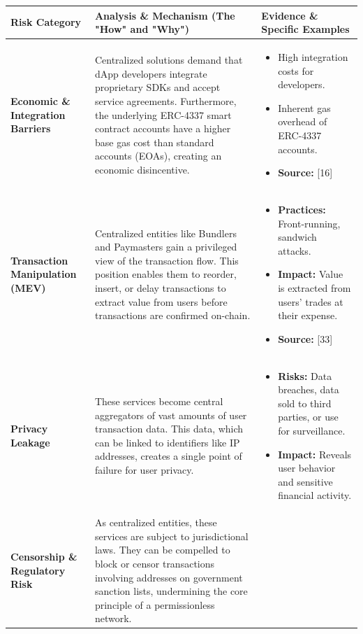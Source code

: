 \documentclass[preprint,12pt]{elsarticle}
\begin{document}
\begin{table}[htbp]
\centering
\footnotesize
\renewcommand{\arraystretch}{0.9}
\begin{tabularx}{\textwidth}{|p{3cm}|X|X|}
\hline
\textbf{Risk Category} & \textbf{Analysis \& Mechanism (The "How" and "Why")} & \textbf{Evidence \& Specific Examples} \\
\hline
\textbf{Economic \& Integration Barriers} & Centralized solutions demand that dApp developers integrate proprietary SDKs and accept service agreements. Furthermore, the underlying ERC-4337 smart contract accounts have a higher base gas cost than standard accounts (EOAs), creating an economic disincentive. & \begin{itemize}[noitemsep,topsep=0pt]
\item High integration costs for developers.
\item Inherent gas overhead of ERC-4337 accounts.
\item \textbf{Source:} [16]
\end{itemize} \\
\hline
\textbf{Transaction Manipulation (MEV)} & Centralized entities like Bundlers and Paymasters gain a privileged view of the transaction flow. This position enables them to reorder, insert, or delay transactions to extract value from users before transactions are confirmed on-chain. & \begin{itemize}[noitemsep,topsep=0pt]
\item \textbf{Practices:} Front-running, sandwich attacks.
\item \textbf{Impact:} Value is extracted from users' trades at their expense.
\item \textbf{Source:} [33]
\end{itemize} \\
\hline
\textbf{Privacy Leakage} & These services become central aggregators of vast amounts of user transaction data. This data, which can be linked to identifiers like IP addresses, creates a single point of failure for user privacy. & \begin{itemize}[noitemsep,topsep=0pt]
\item \textbf{Risks:} Data breaches, data sold to third parties, or use for surveillance.
\item \textbf{Impact:} Reveals user behavior and sensitive financial activity.
\end{itemize} \\
\hline
\textbf{Censorship \& Regulatory Risk} & As centralized entities, these services are subject to jurisdictional laws. They can be compelled to block or censor transactions involving addresses on government sanction lists, undermining the core principle of a permissionless network. & \begin{itemize}[noitemsep,topsep=0pt]

\end{itemize}
\end{tabularx}
\end{table}
\end{document}
